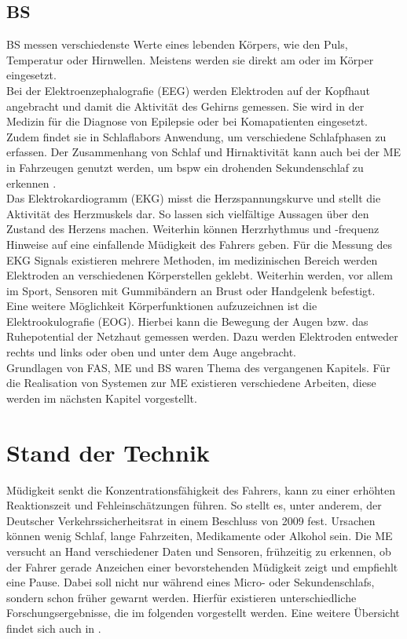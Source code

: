{\subsection{\acl{BS}}
\acl{BS} messen verschiedenste Werte eines lebenden Körpers, wie den Puls, Temperatur oder Hirnwellen. Meistens werden sie direkt am oder im Körper eingesetzt.\\

Bei der Elektroenzephalografie (EEG) werden Elektroden auf der Kopfhaut angebracht und damit die Aktivität des Gehirns gemessen. Sie wird in der Medizin für die Diagnose von Epilepsie oder bei Komapatienten eingesetzt. Zudem findet sie in Schlaflabors Anwendung, um verschiedene Schlafphasen zu erfassen. Der Zusammenhang von Schlaf und Hirnaktivität kann auch bei der \acl{ME} in Fahrzeugen genutzt werden, um \acl{bspw} ein drohenden Sekundenschlaf zu erkennen \cite{Santamaria_eeg}. \\

Das Elektrokardiogramm (EKG) misst die Herzspannungskurve und stellt die Aktivität des Herzmuskels dar. So lassen sich vielfältige Aussagen über den Zustand des Herzens machen. Weiterhin können Herzrhythmus und -frequenz Hinweise auf eine einfallende Müdigkeit des Fahrers geben. Für die Messung des EKG Signals existieren mehrere Methoden, im medizinischen Bereich werden Elektroden an verschiedenen Körperstellen geklebt. Weiterhin werden, vor allem im Sport, Sensoren mit Gummibändern an Brust oder Handgelenk befestigt. \\

Eine weitere Möglichkeit Körperfunktionen aufzuzeichnen ist die Elektrookulografie (EOG). Hierbei kann die Bewegung der Augen bzw. das Ruhepotential der Netzhaut gemessen werden. Dazu werden Elektroden entweder rechts und links oder oben und unter dem Auge angebracht.\\

Grundlagen von \acl{FAS}, \acl{ME} und \acl{BS} waren Thema des vergangenen Kapitels. Für die Realisation von Systemen zur \acl{ME} existieren verschiedene Arbeiten, diese werden im nächsten Kapitel vorgestellt.

\section{Stand der Technik}
\label{chap:me}
Müdigkeit senkt die Konzentrationsfähigkeit des Fahrers, kann zu einer erhöhten Reaktionszeit und Fehleinschätzungen führen. So stellt es, unter anderem, der Deutscher Verkehrssicherheitsrat in einem Beschluss von 2009 \cite{DVR:Online} fest. Ursachen können wenig Schlaf, lange Fahrzeiten, Medikamente oder Alkohol sein.
Die \acl{ME} versucht an Hand verschiedener Daten und Sensoren, frühzeitig zu erkennen, ob der Fahrer gerade Anzeichen einer bevorstehenden Müdigkeit zeigt und empfiehlt eine Pause. Dabei soll nicht nur während eines Micro- oder Sekundenschlafs, sondern schon früher gewarnt werden. Hierfür existieren unterschiedliche Forschungsergebnisse, die im folgenden vorgestellt werden. Eine weitere Übersicht findet sich auch in \cite{Sahayadhas_121216937}.\\

}
